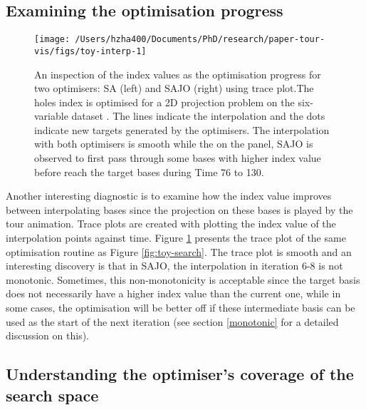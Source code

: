 \hypertarget{toy-interp}{%
\subsection{Examining the optimisation progress}\label{toy-interp}}

\begin{Schunk}
\begin{figure}

{\centering \texttt{[image: /Users/hzha400/Documents/PhD/research/paper-tour-vis/figs/toy-interp-1]} 

}

\caption[An inspection of the index values as the optimisation progress for two optimisers]{An inspection of the index values as the optimisation progress for two optimisers: SA (left) and SAJO (right) using trace plot.The holes index is optimised for a 2D projection problem on the six-variable dataset . The lines indicate the interpolation and the dots indicate new targets generated by the optimisers. The interpolation with both optimisers is smooth while the on the panel, SAJO is observed to first pass through some bases with higher index value before reach the target bases during Time 76 to 130.}\label{fig:toy-interp}
\end{figure}
\end{Schunk}

Another interesting diagnostic is to examine how the index value
improves between interpolating bases since the projection on these bases
is played by the tour animation. Trace plots are created with plotting
the index value of the interpolation points against time. Figure
\ref{fig:toy-interp} presents the trace plot of the same optimisation
routine as Figure \ref{fig:toy-search}. The trace plot is smooth and an
interesting discovery is that in SAJO, the interpolation in iteration
6-8 is not monotonic. Sometimes, this non-monotonicity is acceptable
since the target basis does not necessarily have a higher index value
than the current one, while in some cases, the optimisation will be
better off if these intermediate basis can be used as the start of the
next iteration (see section \ref{monotonic} for a detailed discussion on
this).

\hypertarget{toy-pca}{%
\subsection{Understanding the optimiser's coverage of the search
space}\label{toy-pca}}

